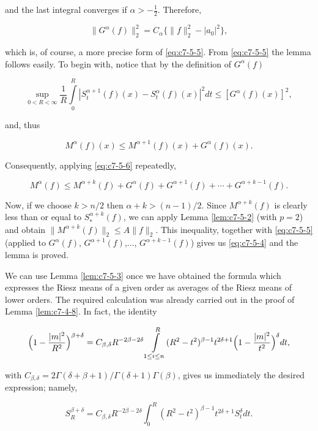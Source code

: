 and the last integral converges if $\alpha > -\frac{1}{2}$. Therefore,

\[
\|G^{\alpha}(f)\|_{2}^{2}=C_{\alpha}\{\|f\|_{2}^{2}-|a_{0}|^{2}\},
\]

which is, of course, a more precise form of \eqref{eq:c7-5-5}. From \eqref{eq:c7-5-5} the lemma follows easily. To begin with, notice that by the definition of $G^{\alpha}(f)$

\[
\sup_{0<R<\infty}\frac{1}{R}\int\limits_{0}^{R}\left|S_{t}^{\alpha+1}(f)(x)-S_{t}^{\alpha}(f)(x)\right|^{2}d t\leq[G^{\alpha}(f)(x)]^{2},
\]

and, thus

\begin{equation}\label{eq:c7-5-6}
M^{\alpha}(f)(x)\leq M^{\alpha+1}(f)(x)+G^{\alpha}(f)(x).
\end{equation}

Consequently, applying \eqref{eq:c7-5-6} repeatedly,

\begin{equation}\label{eq:c7-5-7}
M^{\alpha}(f)\leq M^{\alpha+k}(f)+G^{\alpha}(f)+G^{\alpha+1}(f)+\cdots+G^{\alpha+k-1}(f).
\end{equation}

Now, if we choose $k > n/2$ then $\alpha + k > (n-1)/2$. Since $M^{\alpha+k}(f)$ is clearly less than or equal to $S_{*}^{\alpha+k}(f)$, we can apply Lemma \ref{lem:c7-5-2} (with $p = 2$) and obtain $\|M^{\alpha+k}(f)\|_{2} \leq A\|f\|_{2}$. This inequality, together with \eqref{eq:c7-5-5} (applied to $G^{\alpha}(f)$, $G^{\alpha+1}(f)$,..., $G^{\alpha+k-1}(f)$) gives us \eqref{eq:c7-5-4} and the lemma is proved.

We can use Lemma \ref{lem:c7-5-3} once we have obtained the formula which expresses the Riesz means of a given order as averages of the Riesz means of lower orders. The required calculation was already carried out in the proof of Lemma \ref{lem:c7-4-8}. In fact, the identity

\[
\Bigl(1-\frac{|m|^{2}}{R^{2}}\Bigr)^{\beta+\delta}=C_{\beta,\delta}R^{-2\beta-2\delta}\intop_{1\leq i\leq n}^{R}(R^{2}-t^{2})^{\beta-1}t^{2\delta+1}\Bigl(1-\frac{|m|^{2}}{t^{2}}\Bigr)^{\delta}d t,
\]

with $C_{\beta,\delta} = 2\Gamma(\delta + \beta + 1)/\Gamma(\delta + 1)\Gamma(\beta)$, gives us immediately the desired expression; namely,

\begin{equation}\label{eq:c7-5-8}
S_{R}^{\beta+\delta}=C_{\beta,\delta}R^{-2\beta-2\delta}\int_{0}^{R}(R^{2}-t^{2})^{\beta-1}t^{2\delta+1}S_{t}^{\delta}d t.
\end{equation}

